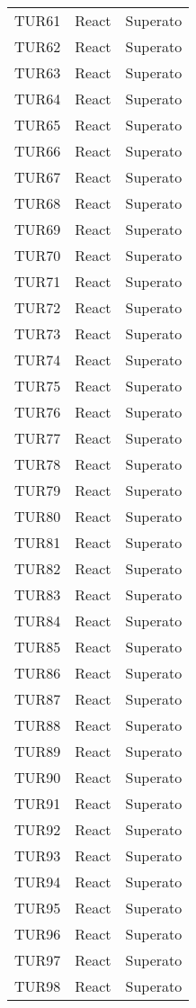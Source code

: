 \documentclass[PianoDiQualifica.tex]{subfiles}
\begin{document}
\begin{longtable}[H]{P{2cm}P{8.5cm}P{3cm}}
	TUR61 & React & Superato \\ 
	TUR62 & React & Superato \\ 
	TUR63 & React & Superato \\ 
	TUR64 & React & Superato \\ 
	TUR65 & React & Superato \\ 
	TUR66 & React & Superato \\ 
	TUR67 & React & Superato \\ 
	TUR68 & React & Superato \\ 
	TUR69 & React & Superato \\ 
	TUR70 & React & Superato \\ 
	TUR71 & React & Superato \\ 
	TUR72 & React & Superato \\ 
	TUR73 & React & Superato \\ 
	TUR74 & React & Superato \\ 
	TUR75 & React & Superato \\ 
	TUR76 & React & Superato \\ 
	TUR77 & React & Superato \\ 
	TUR78 & React & Superato \\ 
	TUR79 & React & Superato \\ 
	TUR80 & React & Superato \\ 
	TUR81 & React & Superato \\ 
	TUR82 & React & Superato \\ 
	TUR83 & React & Superato \\ 
	TUR84 & React & Superato \\ 
	TUR85 & React & Superato \\ 
	TUR86 & React & Superato \\ 
	TUR87 & React & Superato \\ 
	TUR88 & React & Superato \\ 
	TUR89 & React & Superato \\ 
	TUR90 & React & Superato \\ 
	TUR91 & React & Superato \\ 
	TUR92 & React & Superato \\ 
	TUR93 & React & Superato \\ 
	TUR94 & React & Superato \\ 
	TUR95 & React & Superato \\ 
	TUR96 & React & Superato \\ 
	TUR97 & React & Superato \\ 
	TUR98 & React & Superato \\ 

\end{longtable}
\end{document}
